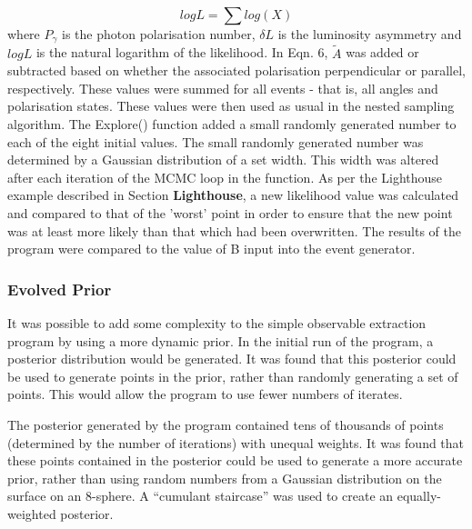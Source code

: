 \documentclass[a4paper,12pt]{article}
\begin{document}
\begin{equation}
logL = \sum log(X)
\end{equation}
where $P_{\gamma}$ is the photon polarisation number, $\delta L$ is the luminosity asymmetry and $logL$ is the natural logarithm of the likelihood.  In Eqn. 6, %
$\tilde{A}$ was added or subtracted based on whether the associated polarisation perpendicular or parallel, respectively.  These values were summed for all events - that is, all angles and polarisation states.  
\newline
These values were then used as usual in the nested sampling algorithm.  The Explore() function added a small randomly generated number to each of the eight initial values.  The small randomly generated number was determined by a Gaussian distribution of a set width.  This width was altered after each iteration of the MCMC loop in the function.  As per the Lighthouse example described in Section \textbf{Lighthouse}, a new likelihood value was calculated and compared to that of the 'worst' point in order to ensure that the new point was at least more likely than that which had been overwritten.  The results of the program were compared to the value of B input into the event generator.


\subsubsection{Evolved Prior}
It was possible to add some complexity to the simple observable extraction program by using a more dynamic prior.  In the initial run of the program, a posterior distribution would be generated.  It was found that this posterior could be used to generate points in the prior, rather than randomly generating a set of points.  This would allow the program to use fewer numbers of iterates.

The posterior generated by the program contained tens of thousands of points (determined by the number of iterations) with unequal weights.  It was found that these points contained in the posterior could be used to generate a more accurate prior, rather than using random numbers from a Gaussian distribution on the surface on an 8-sphere.  A ``cumulant staircase'' was used to create an equally-weighted posterior\cite{sivia}.
\end{document}
